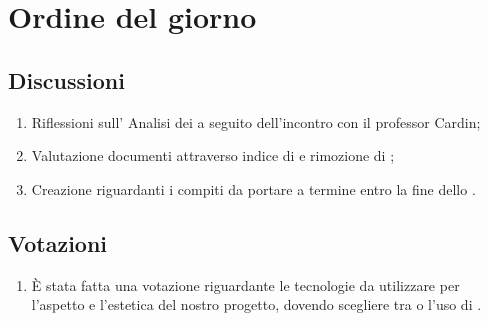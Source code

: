 \section{Ordine del giorno} \label{sec:agenda}
\subsection{Discussioni} \label{subsec:discussione}
\begin{enumerate}
    \item Riflessioni sull' Analisi dei  a seguito dell'incontro con il professor Cardin;
    \item Valutazione documenti attraverso indice di  e rimozione di ;
    \item Creazione  riguardanti i compiti da portare a termine entro la fine dello .
    
\end{enumerate}

\subsection{Votazioni} \label{subsec:votazione}
\begin{enumerate}
    \item È stata fatta una votazione riguardante le tecnologie da utilizzare per l'aspetto e l'estetica del nostro progetto, dovendo scegliere tra  o l'uso di .
\end{enumerate}